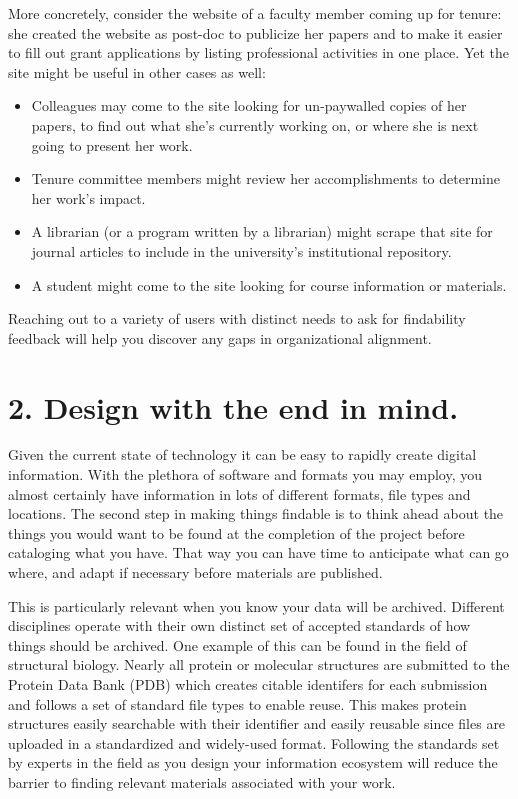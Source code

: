 \documentclass[10pt,letterpaper]{article}
\newcommand{\rulemajor}[1]{\section*{#1}}
\begin{document}
More concretely, consider the website of a faculty member coming up for tenure:
she created the website as post-doc to publicize her papers and to make it
easier to fill out grant applications by listing professional activities in one
place.  Yet the site might be useful in other cases as well:

\begin{itemize}

\item
  Colleagues may come to the site looking for un-paywalled copies of her
  papers, to find out what she's currently working on, or where she is next
  going to present her work.

\item
  Tenure committee members might review her accomplishments to determine her
  work's impact.

\item
  A librarian (or a program written by a librarian) might scrape that site for
  journal articles to include in the university's institutional repository.

\item
  A student might come to the site looking for course information or materials.

\end{itemize}

Reaching out to a variety of users with distinct needs to ask for findability feedback will
help you discover any gaps in organizational alignment.

\rulemajor{2. Design with the end in mind.}

Given the current state of technology it can be easy to rapidly create digital
information. With the plethora of software and formats you may employ, you almost
certainly have information in lots of different formats, file types and locations.
The second step in making things findable is to think ahead about the things you
would want to be found at the completion of the project before cataloging what you
have. That way you can have time to anticipate what can go where, and adapt if
necessary before materials are published. 

This is particularly relevant when you know your data will be archived. Different disciplines operate with their own distinct set of
accepted standards of how things should be archived. One example of this can be
found in the field of structural biology. Nearly all protein or molecular
structures are submitted to the Protein Data Bank (PDB) which creates citable
identifers for each submission and follows a set of standard file types to enable 
reuse. This makes protein structures easily searchable with their identifier 
and easily reusable since files are uploaded in a standardized and widely-used 
format\cite{Wilkinson2016}. Following the standards set by experts in the field 
as you design your information ecosystem will reduce the barrier to finding relevant materials associated with your work.
\end{document}
